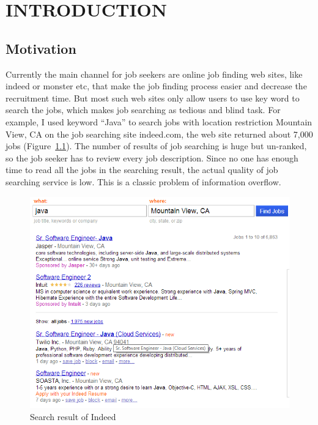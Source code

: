 \chapter{INTRODUCTION}




\section{Motivation}
Currently the main channel for job seekers are online job finding web sites, like indeed or  monster etc, that make the job finding process easier and decrease the recruitment time. But most such web sites only allow users to use key word to search the jobs, which makes job searching as tedious and blind task. For example, I used keyword ``Java'' to search jobs with location restriction Mountain View, CA on the job searching site indeed.com, the web site returned about 7,000 jobs (Figure~\ref{fig:Indeed}). The number of results of job searching is huge but un-ranked, so the job seeker has to review every job description. Since no one has enough time to read all the jobs in the searching result, the actual quality of job searching service is low. This is a classic problem of information overflow.


\begin{figure}[htbp]
  \centering
  \includegraphics[scale=0.4]{images/indeed1.png}
  \caption{Search result of Indeed}
  \label{fig:Indeed}
\end{figure}

